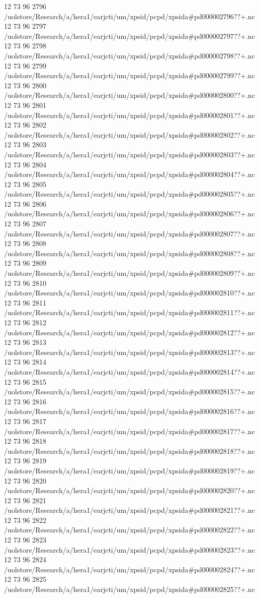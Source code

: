 12 73 96
2796
/uolstore/Research/a/hera1/earjcti/um/xpsid/pcpd/xpsida#pd000002796??+.nc
12 73 96
2797
/uolstore/Research/a/hera1/earjcti/um/xpsid/pcpd/xpsida#pd000002797??+.nc
12 73 96
2798
/uolstore/Research/a/hera1/earjcti/um/xpsid/pcpd/xpsida#pd000002798??+.nc
12 73 96
2799
/uolstore/Research/a/hera1/earjcti/um/xpsid/pcpd/xpsida#pd000002799??+.nc
12 73 96
2800
/uolstore/Research/a/hera1/earjcti/um/xpsid/pcpd/xpsida#pd000002800??+.nc
12 73 96
2801
/uolstore/Research/a/hera1/earjcti/um/xpsid/pcpd/xpsida#pd000002801??+.nc
12 73 96
2802
/uolstore/Research/a/hera1/earjcti/um/xpsid/pcpd/xpsida#pd000002802??+.nc
12 73 96
2803
/uolstore/Research/a/hera1/earjcti/um/xpsid/pcpd/xpsida#pd000002803??+.nc
12 73 96
2804
/uolstore/Research/a/hera1/earjcti/um/xpsid/pcpd/xpsida#pd000002804??+.nc
12 73 96
2805
/uolstore/Research/a/hera1/earjcti/um/xpsid/pcpd/xpsida#pd000002805??+.nc
12 73 96
2806
/uolstore/Research/a/hera1/earjcti/um/xpsid/pcpd/xpsida#pd000002806??+.nc
12 73 96
2807
/uolstore/Research/a/hera1/earjcti/um/xpsid/pcpd/xpsida#pd000002807??+.nc
12 73 96
2808
/uolstore/Research/a/hera1/earjcti/um/xpsid/pcpd/xpsida#pd000002808??+.nc
12 73 96
2809
/uolstore/Research/a/hera1/earjcti/um/xpsid/pcpd/xpsida#pd000002809??+.nc
12 73 96
2810
/uolstore/Research/a/hera1/earjcti/um/xpsid/pcpd/xpsida#pd000002810??+.nc
12 73 96
2811
/uolstore/Research/a/hera1/earjcti/um/xpsid/pcpd/xpsida#pd000002811??+.nc
12 73 96
2812
/uolstore/Research/a/hera1/earjcti/um/xpsid/pcpd/xpsida#pd000002812??+.nc
12 73 96
2813
/uolstore/Research/a/hera1/earjcti/um/xpsid/pcpd/xpsida#pd000002813??+.nc
12 73 96
2814
/uolstore/Research/a/hera1/earjcti/um/xpsid/pcpd/xpsida#pd000002814??+.nc
12 73 96
2815
/uolstore/Research/a/hera1/earjcti/um/xpsid/pcpd/xpsida#pd000002815??+.nc
12 73 96
2816
/uolstore/Research/a/hera1/earjcti/um/xpsid/pcpd/xpsida#pd000002816??+.nc
12 73 96
2817
/uolstore/Research/a/hera1/earjcti/um/xpsid/pcpd/xpsida#pd000002817??+.nc
12 73 96
2818
/uolstore/Research/a/hera1/earjcti/um/xpsid/pcpd/xpsida#pd000002818??+.nc
12 73 96
2819
/uolstore/Research/a/hera1/earjcti/um/xpsid/pcpd/xpsida#pd000002819??+.nc
12 73 96
2820
/uolstore/Research/a/hera1/earjcti/um/xpsid/pcpd/xpsida#pd000002820??+.nc
12 73 96
2821
/uolstore/Research/a/hera1/earjcti/um/xpsid/pcpd/xpsida#pd000002821??+.nc
12 73 96
2822
/uolstore/Research/a/hera1/earjcti/um/xpsid/pcpd/xpsida#pd000002822??+.nc
12 73 96
2823
/uolstore/Research/a/hera1/earjcti/um/xpsid/pcpd/xpsida#pd000002823??+.nc
12 73 96
2824
/uolstore/Research/a/hera1/earjcti/um/xpsid/pcpd/xpsida#pd000002824??+.nc
12 73 96
2825
/uolstore/Research/a/hera1/earjcti/um/xpsid/pcpd/xpsida#pd000002825??+.nc
